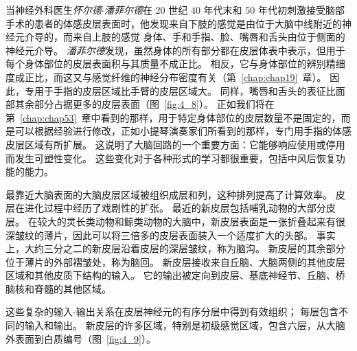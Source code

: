 当神经外科医生\textit{怀尔德$\cdot$潘菲尔德}在 20 世纪 40 年代末和 50 年代初刺激接受脑部手术的患者的体感皮层表面时，他发现来自下肢的感觉是由位于大脑中线附近的神经元介导的，而来自上肢的感觉 身体、手和手指、脸、嘴唇和舌头由位于侧面的神经元介导。 
\textit{潘菲尔德}发现，虽然身体的所有部分都在皮层体表中表示，但用于每个身体部位的皮层表面积与其质量不成正比。 
相反，它与身体部位的辨别精细度成正比，而这又与感觉纤维的神经分布密度有关（第~\ref{chap:chap19}~章）。 
因此，专用于手指的皮层区域比手臂的皮层区域大。 
同样，嘴唇和舌头的表征比面部其余部分占据更多的皮层表面（图~\ref{fig:4_8}）。
正如我们将在第~\ref{chap:chap53}~章中看到的那样，用于特定身体部位的皮层数量不是固定的，而是可以根据经验进行修改，正如小提琴演奏家们所看到的那样，专门用手指的体感皮层区域有所扩展。
这说明了大脑回路的一个重要方面：它能够响应使用或停用而发生可塑性变化。
这些变化对于各种形式的学习都很重要，包括中风后恢复功能的能力。


最靠近大脑表面的大脑皮层区域被组织成层和列，这种排列提高了计算效率。 
皮层在进化过程中经历了戏剧性的扩张。 
最近的新皮层包括哺乳动物的大部分皮层。 
在较大的灵长类动物和鲸类动物的大脑中，新皮层表面是一张折叠起来有很深皱纹的薄片，因此可以将三倍多的皮层表面装入一个适度扩大的头部。 
事实上，大约三分之二的新皮层沿着皮层的深层皱纹，称为脑沟。 
新皮层的其余部分位于薄片的外部褶皱处，称为脑回。 
新皮层接收来自丘脑、大脑两侧的其他皮层区域和其他皮质下结构的输入。 
它的输出被定向到皮层、基底神经节、丘脑、桥脑核和脊髓的其他区域。


这些复杂的输入-输出关系在皮层神经元的有序分层中得到有效组织； 每层包含不同的输入和输出。 
新皮层的许多区域，特别是初级感觉区域，包含六层，从大脑外表面到白质编号（图~\ref{fig:4_9}）。

